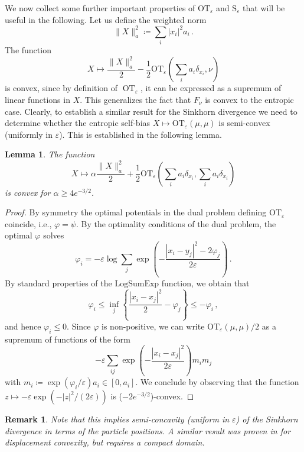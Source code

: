 \documentclass[12pt]{amsart}
\numberwithin{equation}{section}
\let\mr=\mathrm
\theoremstyle{plain}
\newtheorem{remark}[theorem]{Remark}
\newtheorem{lemma}[theorem]{Lemma}
\theoremstyle{definition}
\begin{document}
We now collect some further important properties of $\mr{OT}_\varepsilon$ and $\mr{S}_\varepsilon$ that will be useful in the following.
Let us define the weighted norm
\[
\|X\|_a^2 \coloneqq \sum_i|x_i|^2 a_i\,.
\]
The function 
\[
X \mapsto \frac{\|X\|^2_a}{2} -\frac{1}2 \mr{OT}_\varepsilon\left( \sum_i a_i \delta_{x_i}, \nu \right)
\]
is  convex, since by definition of $\operatorname{OT}_\varepsilon$, it can be expressed as a supremum of linear functions in $X$. This generalizes the fact that $F_\nu$ is convex to the entropic case. 
Clearly, to establish a similar result for the Sinkhorn divergence we need to determine whether the entropic self-bias $X\mapsto \mr{OT}_\varepsilon(\mu,\mu)$ is semi-convex (uniformly in $\varepsilon$). This is established in the following lemma.

\begin{lemma}\label{lem:convdebias}
The function
\[
X \mapsto \alpha \frac{\|X\|^2_a}{2} + \frac{1}{2}\mr{OT}_\varepsilon\left( \sum_i a_i \delta_{x_i},\sum_i a_i \delta_{x_i}\right)
\]
is convex for $\alpha\geq 4 e^{-3/2}$.
\end{lemma}

\begin{proof}
By symmetry the optimal potentials in the dual problem defining $\mr{OT}_\varepsilon$ coincide, i.e., $\varphi=\psi$. By the optimality conditions of the dual problem, the optimal $\varphi$ solves 
\[
{\varphi_i} = -\varepsilon \log\sum_j \exp\left( -\frac{|x_i-y_j|^2 -2\varphi_j}{2\varepsilon} \right)\,.
\]
By standard properties of the $\mr{LogSumExp}$ function, we obtain that 
\[
{\varphi_i} \leq \inf_j \left\{\frac{|x_i-x_j|^2 }{2}- \varphi_j \right\} \leq -{\varphi_i}\,,
\]
and hence $\varphi_i\leq 0$. Since $\varphi$ is non-positive, we can write $\mr{OT}_\varepsilon(\mu,\mu)/2$ as a supremum of functions of the form
\[
- \varepsilon \sum_{ij} \exp\left( - \frac{|x_i -x_j|^2}{2\varepsilon} \right) m_im_j  
\]
with $m_i \coloneqq \exp(\varphi_i/\varepsilon)a_i \in[0,a_i]$. We conclude by observing that the function $z\mapsto -\varepsilon \exp(-|z|^2/(2\varepsilon))$ is ($-2e^{-3/2}$)-convex.
\end{proof}



\begin{remark}
     Note that this implies semi-concavity (uniform in $\varepsilon$) of the Sinkhorn divergence in terms of the particle positions. A similar result was proven in \cite{carlier2024displacement} for displacement convexity, but requires a compact domain. 
\end{remark}
\end{document}
